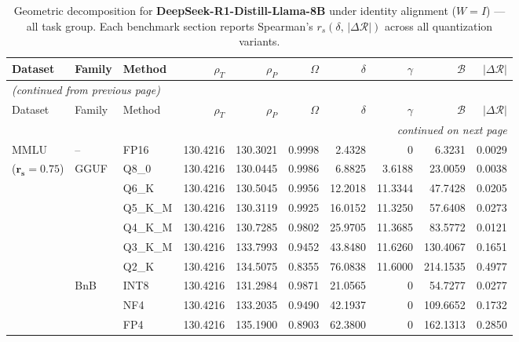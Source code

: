 \begingroup
\small
\setlength{\tabcolsep}{4pt}
\renewcommand{\arraystretch}{1.05}
\begin{longtable}{ll l rrrrrrr}
\caption{Geometric decomposition for \textbf{DeepSeek-R1-Distill-Llama-8B} under identity alignment ($W{=}I$) --- all task group. Each benchmark section reports Spearman's $r_s(\delta,\,|\Delta\mathcal{R}|)$ across all quantization variants.}\label{tab:deepseek_decomposition_all}\\
\toprule
Dataset & Family & Method & $\rho_T$ & $\rho_P$ & $\Omega$ & $\delta$ & $\gamma$ & $\mathcal{B}$ & $|\Delta\mathcal{R}|$ \\
\midrule
\endfirsthead
\multicolumn{10}{l}{\small\itshape (continued from previous page)}\\
\toprule
Dataset & Family & Method & $\rho_T$ & $\rho_P$ & $\Omega$ & $\delta$ & $\gamma$ & $\mathcal{B}$ & $|\Delta\mathcal{R}|$ \\
\midrule
\endhead
\midrule
\multicolumn{10}{r}{\small\itshape continued on next page}\\
\endfoot
\bottomrule
\endlastfoot
MMLU & -- & FP16 & 130.4216 & 130.3021 & 0.9998 & 2.4328 & \cellcolor{cyan!12} $0$ & 6.3231 & 0.0029 \\
{\small ($\mathbf{r_s{=}0.75}$)} & GGUF & Q8\_0 & 130.4216 & 130.0445 & 0.9986 & 6.8825 & 3.6188 & 23.0059 & 0.0038 \\
 &  & Q6\_K & 130.4216 & 130.5045 & 0.9956 & 12.2018 & 11.3344 & 47.7428 & 0.0205 \\
 &  & Q5\_K\_M & 130.4216 & 130.3119 & 0.9925 & 16.0152 & 11.3250 & 57.6408 & 0.0273 \\
 &  & Q4\_K\_M & 130.4216 & 130.7285 & 0.9802 & 25.9705 & 11.3685 & 83.5772 & 0.0121 \\
 &  & Q3\_K\_M & 130.4216 & 133.7993 & \cellcolor{red!18} 0.9452 & \cellcolor{red!18} 43.8480 & 11.6260 & \cellcolor{red!18} 130.4067 & \cellcolor{red!18} 0.1651 \\
 &  & Q2\_K & 130.4216 & 134.5075 & \cellcolor{red!18} 0.8355 & \cellcolor{red!18} 76.0838 & 11.6000 & \cellcolor{red!18} 214.1535 & \cellcolor{red!18} 0.4977 \\
 & BnB & INT8 & 130.4216 & 131.2984 & 0.9871 & 21.0565 & \cellcolor{cyan!12} $0$ & 54.7277 & 0.0277 \\
 &  & NF4 & 130.4216 & 133.2035 & \cellcolor{red!18} 0.9490 & \cellcolor{red!18} 42.1937 & \cellcolor{cyan!12} $0$ & \cellcolor{red!18} 109.6652 & \cellcolor{red!18} 0.1732 \\
 &  & FP4 & 130.4216 & 135.1900 & \cellcolor{red!18} 0.8903 & \cellcolor{red!18} 62.3800 & \cellcolor{cyan!12} $0$ & \cellcolor{red!18} 162.1313 & \cellcolor{red!18} 0.2850 \\

\end{longtable}
